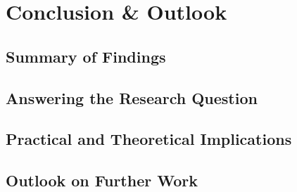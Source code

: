 \chapter{Conclusion \& Outlook}
\label{kap:Fazit}

\section{Summary of Findings}
\label{sec:Fazit_Summary}

\section{Answering the Research Question}
\label{sec:Fazit_ResearchQuestion}

\section{Practical and Theoretical Implications}
\label{sec:Fazit_Implications}

\section{Outlook on Further Work}
\label{sec:Fazit_Outlook}

